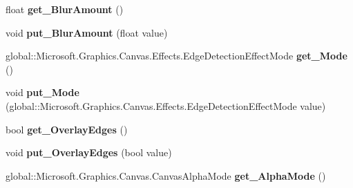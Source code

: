 \begin{DoxyCompactItemize}
float {\bfseries get\+\_\+\+Blur\+Amount} ()
\item 
\mbox{\label{class_microsoft_1_1_graphics_1_1_canvas_1_1_effects_1_1_edge_detection_effect_a73881826da0680e80bc3fabfb027cfd7}} 
void {\bfseries put\+\_\+\+Blur\+Amount} (float value)
\item 
\mbox{\label{class_microsoft_1_1_graphics_1_1_canvas_1_1_effects_1_1_edge_detection_effect_a6c501576c1a32800807da3e3b7750015}} 
global\+::\+Microsoft.\+Graphics.\+Canvas.\+Effects.\+Edge\+Detection\+Effect\+Mode {\bfseries get\+\_\+\+Mode} ()
\item 
\mbox{\label{class_microsoft_1_1_graphics_1_1_canvas_1_1_effects_1_1_edge_detection_effect_a6f2ec4b23f0bd052e66ab4f0520145d5}} 
void {\bfseries put\+\_\+\+Mode} (global\+::\+Microsoft.\+Graphics.\+Canvas.\+Effects.\+Edge\+Detection\+Effect\+Mode value)
\item 
\mbox{\label{class_microsoft_1_1_graphics_1_1_canvas_1_1_effects_1_1_edge_detection_effect_a745adc8a87eda5967288647127125b99}} 
bool {\bfseries get\+\_\+\+Overlay\+Edges} ()
\item 
\mbox{\label{class_microsoft_1_1_graphics_1_1_canvas_1_1_effects_1_1_edge_detection_effect_aed02b04299f1e9aaa193a2836da03fb3}} 
void {\bfseries put\+\_\+\+Overlay\+Edges} (bool value)
\item 
\mbox{\label{class_microsoft_1_1_graphics_1_1_canvas_1_1_effects_1_1_edge_detection_effect_a807b89c06507ab3f180bd69e88b0868d}} 
global\+::\+Microsoft.\+Graphics.\+Canvas.\+Canvas\+Alpha\+Mode {\bfseries get\+\_\+\+Alpha\+Mode} ()
\item 
\mbox{\label{class_microsoft_1_1_graphics_1_1_canvas_1_1_effects_1_1_edge_detection_effect_a9a08543abae46a861e546beeb02a638c}} 

\end{DoxyCompactItemize}
